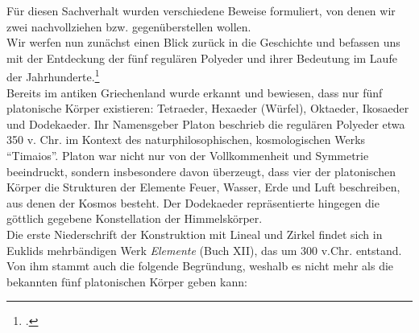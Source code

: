 Für diesen Sachverhalt wurden verschiedene Beweise formuliert, von denen wir zwei nachvollziehen bzw. gegenüberstellen wollen. \\
Wir werfen nun zunächst einen Blick zurück in die Geschichte und befassen uns mit der Entdeckung der fünf regulären Polyeder und ihrer Bedeutung im Laufe der Jahrhunderte.\footcite[Die Informationen zur Geschichte stammen von][]{Endl1993} \\
Bereits im antiken Griechenland wurde erkannt und bewiesen, dass nur fünf platonische Körper existieren: Tetraeder, Hexaeder (Würfel), Oktaeder, Ikosaeder und Dodekaeder. Ihr Namensgeber Platon beschrieb die regulären Polyeder etwa 350 v. Chr. im Kontext des naturphilosophischen, kosmologischen Werks \enquote{Timaios}. Platon war nicht nur von der Vollkommenheit und Symmetrie beeindruckt, sondern insbesondere davon überzeugt, dass vier der platonischen Körper die Strukturen der Elemente Feuer, Wasser, Erde und Luft beschreiben, aus denen der Kosmos besteht. Der Dodekaeder repräsentierte hingegen die göttlich gegebene Konstellation der Himmelskörper.\\
Die erste Niederschrift der Konstruktion mit Lineal und Zirkel findet sich in Euklids mehrbändigen Werk \textit{Elemente} (Buch XII), das um 300 v.Chr. entstand. Von ihm stammt auch die folgende Begründung, weshalb es nicht mehr als die bekannten fünf platonischen Körper geben kann:
